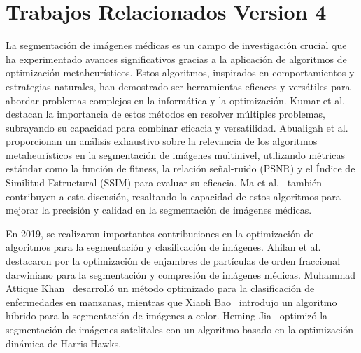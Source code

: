 \documentclass[conference]{IEEEtran}
\begin{document}






\section{Trabajos Relacionados Version 4}\label{sec:rw}
\noindent La segmentación de imágenes médicas es un campo de investigación crucial que ha experimentado avances significativos gracias a la aplicación de algoritmos de optimización metaheurísticos. Estos algoritmos, inspirados en comportamientos y estrategias naturales, han demostrado ser herramientas eficaces y versátiles para abordar problemas complejos en la informática y la optimización. Kumar et al.~\cite{Kumar2022} destacan la importancia de estos métodos en resolver múltiples problemas, subrayando su capacidad para combinar eficacia y versatilidad. Abualigah et al.~\cite{Abualigah2023} proporcionan un análisis exhaustivo sobre la relevancia de los algoritmos metaheurísticos en la segmentación de imágenes multinivel, utilizando métricas estándar como la función de fitness, la relación señal-ruido (PSNR) y el Índice de Similitud Estructural (SSIM) para evaluar su eficacia. Ma et al.~\cite{Ma2023} también contribuyen a esta discusión, resaltando la capacidad de estos algoritmos para mejorar la precisión y calidad en la segmentación de imágenes médicas.

\noindent En 2019, se realizaron importantes contribuciones en la optimización de algoritmos para la segmentación y clasificación de imágenes. Ahilan et al.~\cite{Ahilan2019} destacaron por la optimización de enjambres de partículas de orden fraccional darwiniano para la segmentación y compresión de imágenes médicas. Muhammad Attique Khan~\cite{Khan2019} desarrolló un método optimizado para la clasificación de enfermedades en manzanas, mientras que Xiaoli Bao~\cite{Bao2019} introdujo un algoritmo híbrido para la segmentación de imágenes a color. Heming Jia~\cite{Jia2019} optimizó la segmentación de imágenes satelitales con un algoritmo basado en la optimización dinámica de Harris Hawks.
\end{document}
